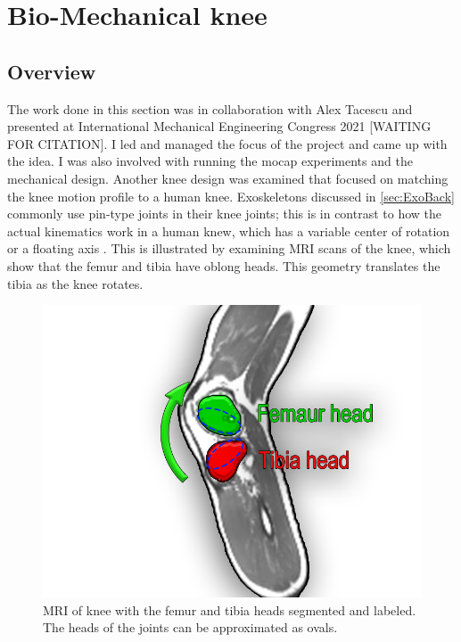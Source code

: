 \section{Bio-Mechanical knee}

\subsection{Overview}
The work done in this section was in collaboration with Alex Tacescu \cite{tacescu2021development} and presented at International Mechanical Engineering Congress 2021 [WAITING FOR CITATION]. I led and managed the focus of the project and came up with the idea. I was also involved with running the mocap experiments and the mechanical design. Another knee design was examined that focused on matching the knee motion profile to a human knee. Exoskeletons discussed in \autoref{sec:ExoBack} commonly use pin-type joints in their knee joints; this is in contrast to how the actual kinematics work in a human knew, which has a variable center of rotation or a floating axis \cite{morrison1970mechanics} \cite{koo2008knee} \cite{grood1983joint}. This is illustrated by examining MRI scans of the knee, which show that the femur and tibia have oblong heads\cite{MRIKneeScan}. This geometry translates the tibia as the knee rotates. 




\begin{figure}[h!]
    \centering
    \includegraphics[scale=0.5]{images/mech_design/MRI_knee_label.png}
    \caption[Labled MRI of knee]{MRI of knee with the femur and tibia heads segmented and labeled. The heads of the joints can be approximated as ovals. }
    \label{fig:MRIKnee}
\end{figure}


